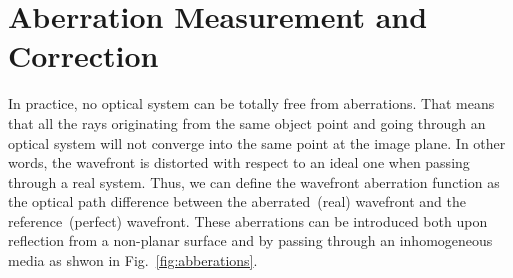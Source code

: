 \section{Aberration Measurement and Correction}
\label{Measurement}


In practice, no optical system can be totally free from aberrations. That means that all the rays originating from the same object point and going through an optical system will not converge into the same point at the image plane. In other words, the wavefront is distorted with respect to an ideal one when passing through a real system. Thus, we can define the wavefront aberration function as the optical path difference between the aberrated~(real) wavefront and the reference~(perfect) wavefront. These aberrations can be introduced both upon reflection from a non-planar surface and by passing through an inhomogeneous media as shwon in Fig.~\ref{fig:abberations}. 

